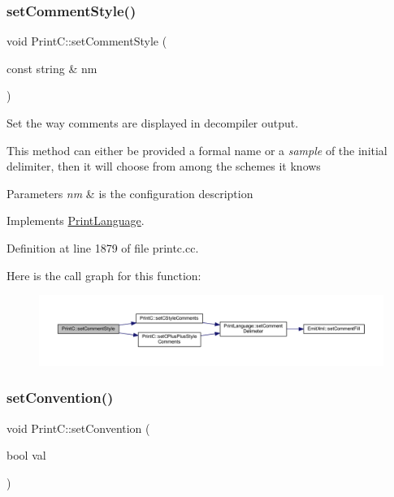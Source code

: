 \subsubsection{\texorpdfstring{setCommentStyle()}{setCommentStyle()}}
{\footnotesize\ttfamily void Print\+C\+::set\+Comment\+Style (\begin{DoxyParamCaption}\item[{const string \&}]{nm }\end{DoxyParamCaption})\hspace{0.3cm}{\ttfamily [virtual]}}



Set the way comments are displayed in decompiler output. 

This method can either be provided a formal name or a {\itshape sample} of the initial delimiter, then it will choose from among the schemes it knows 
\begin{DoxyParams}{Parameters}
{\em nm} & is the configuration description \\
\hline
\end{DoxyParams}


Implements \mbox{\hyperlink{class_print_language_aa9f7b4fbc646531cfe3f9ad571f04ab1}{Print\+Language}}.



Definition at line 1879 of file printc.\+cc.

Here is the call graph for this function\+:
\nopagebreak
\begin{figure}[H]
\begin{center}
\leavevmode
\includegraphics[width=350pt]{class_print_c_a8798b0408fa3386c91f9df92f63cbd15_cgraph}
\end{center}
\end{figure}
\mbox{\label{class_print_c_a0bb81b8247d7390388474a300873b460}} 
\subsubsection{\texorpdfstring{setConvention()}{setConvention()}}
{\footnotesize\ttfamily void Print\+C\+::set\+Convention (\begin{DoxyParamCaption}\item[{bool}]{val }\end{DoxyParamCaption})\hspace{0.3cm}{\ttfamily [inline]}}




